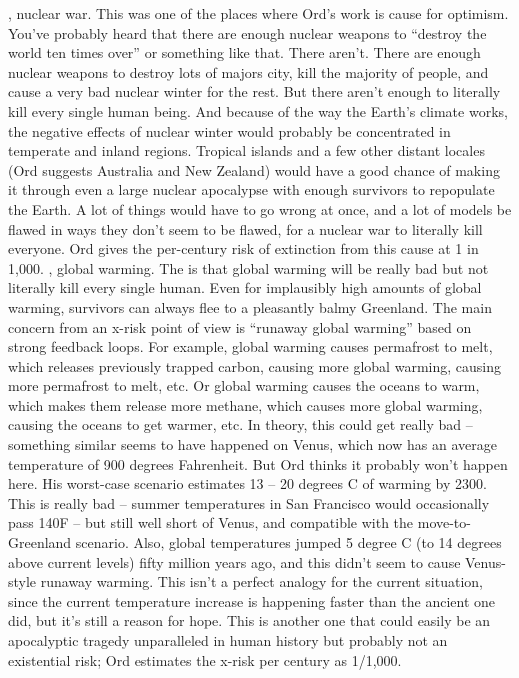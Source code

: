 \begin{xmlentries}
\begin{xmlentriescontent}
{ \htmlp {}, nuclear war. This was one of the places where Ord’s work is cause for optimism. You’ve probably heard that there are enough nuclear weapons to “destroy the world ten times over” or something like that. There aren’t. There are enough nuclear weapons to destroy lots of majors city, kill the majority of people, and cause a very bad nuclear winter for the rest. But there aren’t enough to literally kill every single human being. And because of the way the Earth’s climate works, the negative effects of nuclear winter would probably be concentrated in temperate and inland regions. Tropical islands and a few other distant locales (Ord suggests Australia and New Zealand) would have a good chance of making it through even a large nuclear apocalypse with enough survivors to repopulate the Earth. A lot of things would have to go wrong at once, and a lot of models be flawed in ways they don’t seem to be flawed, for a nuclear war to literally kill everyone. Ord gives the per-century risk of extinction from this cause at 1 in 1,000.
 \htmlp {}, global warming. The   is that global warming will be really bad but not literally kill every single human. Even for implausibly high amounts of global warming, survivors can always flee to a pleasantly balmy Greenland. The main concern from an x-risk point of view is “runaway global warming” based on strong feedback loops. For example, global warming causes permafrost to melt, which releases previously trapped carbon, causing more global warming, causing more permafrost to melt, etc. Or global warming causes the oceans to warm, which makes them release more methane, which causes more global warming, causing the oceans to get warmer, etc. In theory, this could get really bad – something similar seems to have happened on Venus, which now has an average temperature of 900 degrees Fahrenheit. But Ord thinks it probably won’t happen here. His worst-case scenario estimates 13 – 20 degrees C of warming by 2300. This is really bad – summer temperatures in San Francisco would occasionally pass 140F – but still well short of Venus, and compatible with the move-to-Greenland scenario. Also, global temperatures jumped 5 degree C (to 14 degrees above current levels) fifty million years ago, and this didn’t seem to cause Venus-style runaway warming. This isn’t a perfect analogy for the current situation, since the current temperature increase is happening faster than the ancient one did, but it’s still a reason for hope. This is another one that could easily be an apocalyptic tragedy unparalleled in human history but probably not an existential risk; Ord estimates the x-risk per century as 1/1,000.
}
\end{xmlentriescontent}
\end{xmlentries}
